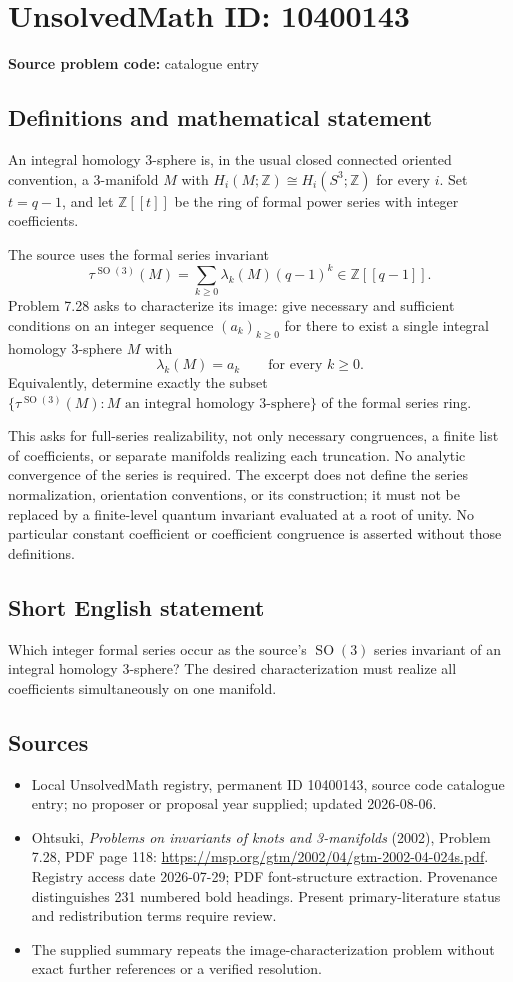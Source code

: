 \documentclass[11pt]{article}
\newcommand{\Z}{\mathbb{Z}}
\begin{document}
\section*{UnsolvedMath ID: 10400143}
\textbf{Source problem code:} catalogue entry
\subsection{Definitions and mathematical statement}
An integral homology 3-sphere is, in the usual closed connected oriented convention, a 3-manifold \(M\) with \(H_i(M;\Z)\cong H_i(S^3;\Z)\) for every \(i\). Set \(t=q-1\), and let \(\Z[[t]]\) be the ring of formal power series with integer coefficients.

The source uses the formal series invariant
\[
 \tau^{\operatorname{SO}(3)}(M)=\sum_{k\geq0}\lambda_k(M)(q-1)^k\in\Z[[q-1]].
\]
Problem 7.28 asks to characterize its image: give necessary and sufficient conditions on an integer sequence \((a_k)_{k\geq0}\) for there to exist a single integral homology 3-sphere \(M\) with
\[
 \lambda_k(M)=a_k\qquad\text{for every }k\geq0.
\]
Equivalently, determine exactly the subset \(\{\tau^{\operatorname{SO}(3)}(M):M\text{ an integral homology 3-sphere}\}\) of the formal series ring.

This asks for full-series realizability, not only necessary congruences, a finite list of coefficients, or separate manifolds realizing each truncation. No analytic convergence of the series is required. The excerpt does not define the series normalization, orientation conventions, or its construction; it must not be replaced by a finite-level quantum invariant evaluated at a root of unity. No particular constant coefficient or coefficient congruence is asserted without those definitions.
\subsection{Short English statement}
Which integer formal series occur as the source's \(\operatorname{SO}(3)\) series invariant of an integral homology 3-sphere? The desired characterization must realize all coefficients simultaneously on one manifold.
\subsection{Sources}
\begin{itemize}
\item Local UnsolvedMath registry, permanent ID 10400143, source code catalogue entry; no proposer or proposal year supplied; updated 2026-08-06.
\item Ohtsuki, \emph{Problems on invariants of knots and 3-manifolds} (2002), Problem 7.28, PDF page 118: \url{https://msp.org/gtm/2002/04/gtm-2002-04-024s.pdf}. Registry access date 2026-07-29; PDF font-structure extraction. Provenance distinguishes 231 numbered bold headings. Present primary-literature status and redistribution terms require review.
\item The supplied summary repeats the image-characterization problem without exact further references or a verified resolution.
\end{itemize}
\end{document}

